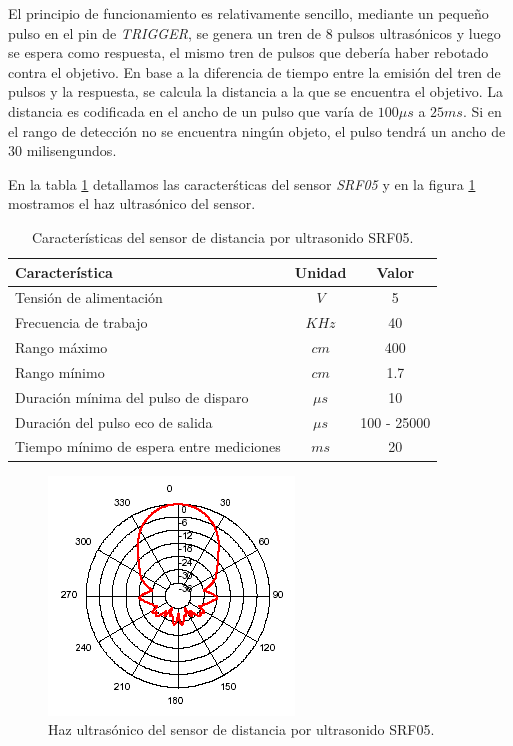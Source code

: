 El principio de funcionamiento es relativamente sencillo, mediante un peque\~no pulso en el pin de \emph{TRIGGER}, se genera un tren de $8$ pulsos
ultras\'onicos y luego se espera como respuesta, el mismo tren de pulsos que deber\'ia haber rebotado contra el objetivo. En base a la diferencia de tiempo
entre la emisi\'on del tren de pulsos y la respuesta, se calcula la distancia a la que se encuentra el objetivo. La distancia es codificada en el ancho
de un pulso que var\'ia de $100\mu s$ a $25 ms$. Si en el rango de detecci\'on no se encuentra ning\'un objeto, el pulso tendr\'a un ancho
de $30$ milisengundos.

En la tabla \ref{HTultrasonido} detallamos las caracter\'sticas del sensor \emph{SRF05} y en la figura \ref{HFultrasonido} mostramos el haz ultras\'onico
del sensor.

\begin{table}
	\begin{center}
		\begin{tabular}{|l|c|c|}
			\hline
			Caracter\'istica & Unidad & Valor\\
			\hline
			Tensi\'on de alimentaci\'on & $V$ & 5 \\
			Frecuencia de trabajo & $KHz$ & 40 \\
			Rango m\'aximo & $cm$ & 400 \\
			Rango m\'inimo & $cm$ & 1.7 \\
			Duración m\'inima del pulso de disparo & $\mu s$ & 10 \\
			Duración del pulso eco de salida & $\mu s$& 100 - 25000 \\
			Tiempo m\'inimo de espera entre mediciones & $m s$ & 20 \\
			\hline
		\end{tabular}
	\end{center}
	\caption{Caracter\'isticas del sensor de distancia por ultrasonido SRF05.}
	\label{HTultrasonido}
\end{table}

\begin{figure}[ht]
	\centering
	\includegraphics[scale=0.5]{us-beam.png}
	\caption{Haz ultras\'onico del sensor de distancia por ultrasonido SRF05.}
	\label{HFultrasonido}
\end{figure}

